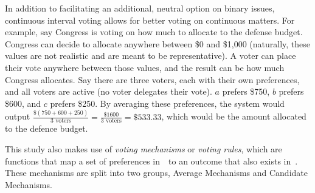 In addition to facilitating an additional, neutral option on binary issues,
continuous interval voting allows for better voting on continuous matters.
For example, say Congress is voting on how much to allocate to the defense budget.
Congress can decide to allocate anywhere between \$0 and \$1,000 (naturally, these
values are not realistic and are meant to be representative).
A voter can place their vote anywhere between those values, and the result can be how
much Congress allocates.
Say there are three voters, each with their own preferences, and all voters are
active (no voter delegates their vote).
$a$ prefers \$750, $b$ prefers \$600, and $c$ prefers \$250.
By averaging these preferences, the system would output
$\frac{\$(750 + 600 + 250)}{3 \text{ voters}} = \frac{\$1600}{3 \text{ voters}} =
\$533.33$, which would be the amount allocated to the defence budget.

This study also makes use of \textit{voting mechanisms} or \textit{voting rules},
which are functions that map a set of preferences in~\systemspace\ to an outcome that
also exists in~\systemspace.
These mechanisms are split into two groups, Average Mechanisms and Candidate Mechanisms.

